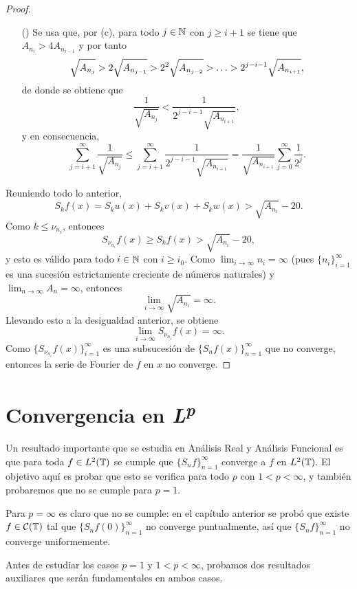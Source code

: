 \documentclass[a4paper, 12pt, oneside]{book}
\begin{document}
\begin{proof}
\begin{itemize}
        \item[(\asts{2})] Se usa que, por (c), para todo $j \in \mathbb N$ con $j \geq i+1$ se tiene que $A_{n_i} > 4A_{n_{i-1}}$ y por tanto
        \[\sqrt{A_{n_j}} > 2\sqrt{A_{n_{j-1}}} > 2^2 \sqrt{A_{n_{j-2}}} > \mathellipsis > 2^{j-i-1}\sqrt{A_{n_{i+1}}},\]
        de donde se obtiene que
        \[\frac{1}{\sqrt{A_{n_j}}} < \frac{1}{2^{j-i-1}\sqrt{A_{n_{i+1}}}},\]
        y en consecuencia,
        \[\sum_{j=i+1}^\infty \frac{1}{\sqrt{A_{n_j}}} \leq \sum_{j=i+1}^\infty \frac{1}{2^{j-i-1}\sqrt{A_{n_{i+1}}}} = \frac{1}{\sqrt{A_{n_{i+1}}}}\sum_{j=0}^\infty \frac{1}{2^j}.\]
    \end{itemize}
    Reuniendo todo lo anterior,
    \[S_kf(x) = S_ku(x)+S_kv(x)+S_kw(x)> \sqrt{A_{n_i}}-20.\]
    Como $k \leq \nu_{n_i}$, entonces
    \[S_{\nu_{n_i}}f(x) \geq S_kf(x) > \sqrt{A_{n_i}}-20,\]
    y esto es válido para todo $i \in \mathbb N$ con $i \geq i_0$. Como $\lim_{i \to \infty} n_i = \infty$ (pues $\{n_i\}_{i=1}^\infty$ es una sucesión estrictamente creciente de números naturales) y $\lim_{n \to \infty} A_n = \infty$, entonces \[\lim_{i \to \infty} \sqrt{A_{n_i}} = \infty.\]
    Llevando esto a la desigualdad anterior, se obtiene
    \[\lim_{i \to \infty} S_{\nu_{n_i}}f(x) = \infty.\]
    Como $\{S_{\nu_{n_i}}f(x)\}_{i=1}^\infty$ es una subsucesión de $\{S_nf(x)\}_{n=1}^\infty$ que no converge, entonces la serie de Fourier de $f$ en $x$ no converge.
\end{proof}

\chapter{Convergencia en \texorpdfstring{\textit{L\textsuperscript{p}}}{\textit{Lp}}}

Un resultado importante que se estudia en Análisis Real y Análisis Funcional es que para toda $f \in L^2(\mathbb T)$ se cumple que $\{S_nf\}_{n=1}^\infty$ converge a $f$ en $L^2(\mathbb T)$. El objetivo aquí es probar que esto se verifica para todo $p$ con $1 < p < \infty$, y también probaremos que no se cumple para $p = 1$. 

Para $p = \infty$ es claro que no se cumple: en el capítulo anterior se probó que existe $f\in\mathcal{C}(\mathbb T)$ tal que $\{S_nf(0)\}_{n=1}^\infty$ no converge puntualmente, así que $\{S_nf\}_{n=1}^\infty$ no converge uniformemente.

Antes de estudiar los casos $p=1$ y $1<p<\infty$, probamos dos resultados auxiliares que serán fundamentales en ambos casos.
\end{document}
